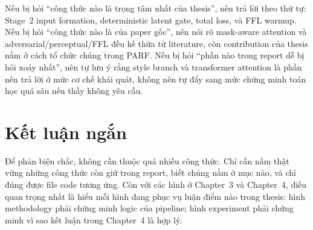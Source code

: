 \documentclass[12pt,a4paper]{article}
\begin{document}
Nếu bị hỏi ``công thức nào là trọng tâm nhất của thesis'', nên trả lời theo thứ tự: Stage~2 input formation, deterministic latent gate, total loss, và FFL warmup. Nếu bị hỏi ``công thức nào là của paper gốc'', nên nói rõ mask-aware attention và adversarial/perceptual/FFL đều kế thừa từ literature, còn contribution của thesis nằm ở cách tổ chức chúng trong PARF. Nếu bị hỏi ``phần nào trong report dễ bị hỏi xoáy nhất'', nên tự lưu ý rằng style branch và transformer attention là phần nên trả lời ở mức cơ chế khái quát, không nên tự đẩy sang mức chứng minh toán học quá sâu nếu thầy không yêu cầu.

\section*{Kết luận ngắn}

Để phản biện chắc, không cần thuộc quá nhiều công thức. Chỉ cần nắm thật vững những công thức còn giữ trong report, biết chúng nằm ở mục nào, và chỉ đúng được file code tương ứng. Còn với các hình ở Chapter~3 và Chapter~4, điều quan trọng nhất là hiểu mỗi hình đang phục vụ luận điểm nào trong thesis: hình methodology phải chứng minh logic của pipeline; hình experiment phải chứng minh vì sao kết luận trong Chapter~4 là hợp lý.
\end{document}
